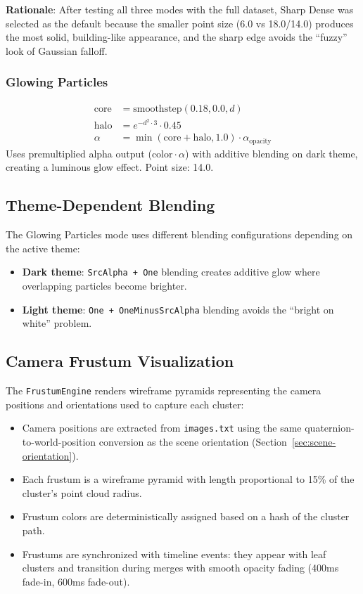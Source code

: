 \documentclass[11pt, letterpaper]{article}
\begin{document}
\textbf{Rationale}: After testing all three modes with the full dataset, Sharp Dense was selected as the default because the smaller point size (6.0 vs 18.0/14.0) produces the most solid, building-like appearance, and the sharp edge avoids the ``fuzzy'' look of Gaussian falloff.

\subsubsection{Glowing Particles}
\begin{align}
    \text{core} &= \text{smoothstep}(0.18, 0.0, d) \\
    \text{halo} &= e^{-d^2 \cdot 3} \cdot 0.45 \\
    \alpha &= \min(\text{core} + \text{halo}, 1.0) \cdot \alpha_{\text{opacity}}
\end{align}
Uses premultiplied alpha output ($\text{color} \cdot \alpha$) with additive blending on dark theme, creating a luminous glow effect. Point size: 14.0.

\subsection{Theme-Dependent Blending}

The Glowing Particles mode uses different blending configurations depending on the active theme:
\begin{itemize}
    \item \textbf{Dark theme}: \texttt{SrcAlpha + One} blending creates additive glow where overlapping particles become brighter.
    \item \textbf{Light theme}: \texttt{One + OneMinusSrcAlpha} blending avoids the ``bright on white'' problem.
\end{itemize}

\subsection{Camera Frustum Visualization}

The \texttt{FrustumEngine} renders wireframe pyramids representing the camera positions and orientations used to capture each cluster:
\begin{itemize}
    \item Camera positions are extracted from \texttt{images.txt} using the same quaternion-to-world-position conversion as the scene orientation (Section~\ref{sec:scene-orientation}).
    \item Each frustum is a wireframe pyramid with length proportional to 15\% of the cluster's point cloud radius.
    \item Frustum colors are deterministically assigned based on a hash of the cluster path.
    \item Frustums are synchronized with timeline events: they appear with leaf clusters and transition during merges with smooth opacity fading (400ms fade-in, 600ms fade-out).
\end{itemize}
\end{document}

